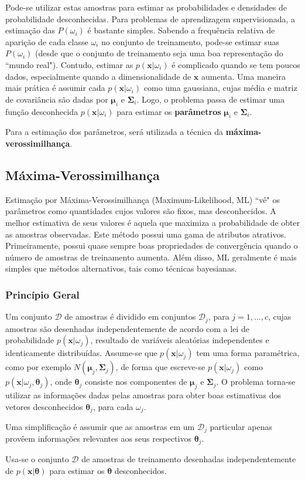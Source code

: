 \documentclass[a4paper,12pt,twocolumn]{article}
\begin{document}
Pode-se utilizar estas amostras para estimar as probabilidades e densidades de probabilidade desconhecidas. Para problemas de aprendizagem supervisionada, a estimação das $P(\omega_i)$ é bastante simples. Sabendo a frequência relativa de aparição de cada classe $\omega_i$ no conjunto de treinamento, pode-se estimar suas $P(\omega_i)$ (desde que o conjunto de treinamento seja uma boa representação do ``mundo real"). Contudo, estimar as $p(\boldsymbol{x}|\omega_i)$ é complicado quando se tem poucos dados, especialmente quando a dimensionalidade de $\boldsymbol{x}$ aumenta. Uma maneira mais prática é assumir cada $p(\boldsymbol{x}|\omega_i)$ como uma gaussiana, cujas média e matriz de covariância são dadas por $\boldsymbol{\mu}_i$ e $\boldsymbol{\Sigma}_i$. Logo, o problema passa de estimar uma função desconhecida $p(\boldsymbol{x}|\omega_i)$ para estimar os \textbf{parâmetros} $\boldsymbol{\mu}_i$ e $\boldsymbol{\Sigma}_i$.

Para a estimação dos parâmetros, será utilizada a técnica da \textbf{máxima-verossimilhança}.

\subsection{Máxima-Verossimilhança}

Estimação por Máxima-Verossimilhança (Maximum-Likelihood, ML) ``vê" os parâmetros como quantidades cujos valores são fixos, mas desconhecidos. A melhor estimativa de seus valores é aquela que maximiza a probabilidade de obter as amostras observadas. Este método possui uma gama de atributos atrativos. Primeiramente, possui quase sempre boas propriedades de convergência quando o número de amostras de treinamento aumenta. Além disso, ML geralmente é mais simples que métodos alternativos, tais como técnicas bayesianas.

\subsubsection*{Princípio Geral}

Um conjunto $\mathcal{D}$ de amostras é dividido em conjuntos $\mathcal{D}_j$, para $j = 1, ..., c$, cujas amostras são desenhadas independentemente de acordo com a lei de probabilidade $p(\boldsymbol{x}|\omega_j)$, resultado de variáveis aleatórias independentes e identicamente distribuídas. Assume-se que $p(\boldsymbol{x}|\omega_j)$ tem uma forma paramétrica, como por exemplo $N(\boldsymbol{\mu}_j, \boldsymbol{\Sigma}_j)$, de forma que escreve-se $p(\boldsymbol{x}|\omega_j)$ como $p(\boldsymbol{x}|\omega_j, \boldsymbol{\theta}_j)$, onde $\boldsymbol{\theta}_j$ consiste nos componentes de $\boldsymbol{\mu}_j$ e $\boldsymbol{\Sigma}_j$. O problema torna-se utilizar as informações dadas pelas amostras para obter boas estimativas dos vetores desconhecidos $\boldsymbol{\theta}_j$, para cada $\omega_j$.

Uma simplificação é assumir que as amostras em um $\mathcal{D}_j$ particular apenas provêem informações relevantes aos seus respectivos $\boldsymbol{\theta}_j$.

Usa-se o conjunto $\mathcal{D}$ de amostras de treinamento desenhadas independentemente de $p(\boldsymbol{x}|\boldsymbol{\theta})$ para estimar os $\boldsymbol{\theta}$ desconhecidos.
\end{document}
